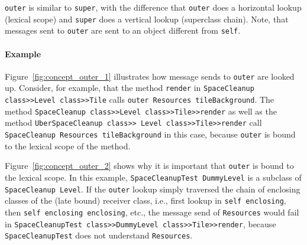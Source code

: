 \texttt{outer} is similar to \texttt{super}, with the difference that \texttt{outer} does a horizontal lookup (lexical scope) and \texttt{super} does a vertical lookup (superclass chain). Note, that messages sent to \texttt{outer} are sent to an object different from \texttt{self}.

\paragraph{Example}
Figure~\ref{fig:concept_outer_1} illustrates how message sends to \texttt{outer} are looked up. Consider, for example, that the method \texttt{render} in \texttt{SpaceCleanup class>>Level class>>Tile} calls \texttt{outer Resources tileBackground}. The method \texttt{SpaceCleanup class>>Level class>>Tile>>render} as well as the method \texttt{UberSpaceCleanup class>> Level class>>Tile>>render} call \texttt{SpaceCleanup Resources tileBackground} in this case, because \texttt{outer} is bound to the lexical scope of the method.

Figure~\ref{fig:concept_outer_2} shows why it is important that \texttt{outer} is bound to the lexical scope. In this example, \texttt{SpaceCleanupTest DummyLevel} is a subclass of \texttt{SpaceCleanup Level}. If the \texttt{outer} lookup simply traversed the chain of enclosing classes of the (late bound) receiver class, i.e., first lookup in \texttt{self enclosing}, then \texttt{self enclosing enclosing}, etc., the message send of \texttt{Resources} would fail in \texttt{SpaceCleanupTest class>>DummyLevel class>>Tile>>render}, because \texttt{SpaceCleanupTest} does not understand \texttt{Resources}.

